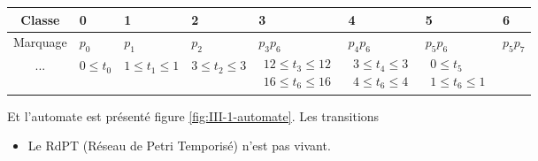 \begin{tabular}{|c || l|l |l|l |l|l |l|}
\hline
Classe 		&	0	&	1	&	2	&	3		&	4		&	5		&	6	\\
\hline\hline
Marquage 	& $p_0$ & $p_1$ & $p_2$ & $p_3 p_6$	& $p_4 p_6$	& $p_5 p_6$	& $p_5 p_7$	\\
\hline
... 							&
 $0 \leq t_0$ 					&	%
 $1  \leq t_1 \leq 1 $ 			&	%
 $3  \leq t_2 \leq 3 $ 			&	%
 $\begin{matrix}
12 \leq t_3 \leq 12\\
	16 \leq t_6 \leq 16
\end{matrix}$					&	%
 $\begin{matrix}
 3 \leq t_4  \leq 3\\
 4 \leq t_6  \leq 4
 \end{matrix}$					&	%
 $\begin{matrix}
 0 \leq t_5 \\
 1 \leq t_6 \leq 1
 \end{matrix}$					&	%
 					 \\ \hline
\end{tabular}

Et l'automate est présenté figure \ref{fig:III-1-automate}. Les transitions 


\begin{itemize}
\item Le RdPT (Réseau de Petri Temporisé) n'est pas vivant. 
\end{itemize}

